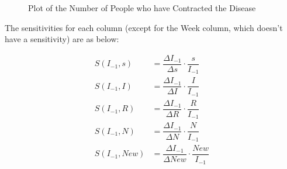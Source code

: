 \documentclass[12pt]{report}
\begin{document}
\begin{figure}[p]
\begin{center}
    \label{total}
    \caption{Plot of the Number of People who have Contracted the Disease}
\end{center}
\end{figure}

The sensitivities for each column (except for the Week column, which doesn't have a sensitivity) are as below: 

\begin{align}
    S(I_{-1},s) &= \dfrac{\Delta I_{-1}}{\Delta s} \cdot \dfrac{s}{I_{-1}} \label{100}\\
    S(I_{-1},I) &= \dfrac{\Delta I_{-1}}{\Delta I} \cdot \dfrac{I}{I_{-1}} \label{101}\\
    S(I_{-1},R) &= \dfrac{\Delta I_{-1}}{\Delta R} \cdot \dfrac{R}{I_{-1}} \label{102}\\
    S(I_{-1},N) &= \dfrac{\Delta I_{-1}}{\Delta N} \cdot \dfrac{N}{I_{-1}} \label{103}\\
    S(I_{-1},New) &= \dfrac{\Delta I_{-1}}{\Delta New} \cdot \dfrac{New}{I_{-1}} \label{104}
\end{align}
\end{document}
